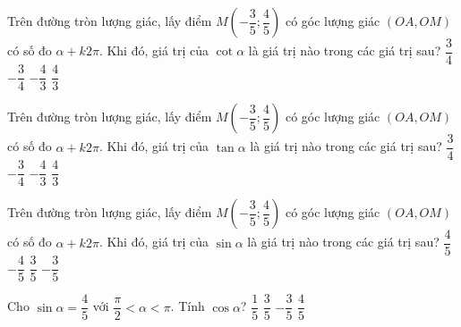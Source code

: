 \begin{ex}%
	Trên đường tròn lượng giác, lấy điểm $M\left(-\dfrac{3}{5};\dfrac{4}{5} \right)$ có góc lượng giác $(OA,OM)$ có số đo $\alpha+k2\pi$.  Khi đó, giá trị của $\cot \alpha$ là giá trị nào trong các giá trị sau?
	\choice 
		{$\dfrac{3}{4}$} 
		 {\True $-\dfrac{3}{4}$}
		{$-\dfrac{4}{3}$} 
		{$\dfrac{4}{3}$} 
\end{ex}

\begin{ex}%
	Trên đường tròn lượng giác, lấy điểm $M\left(-\dfrac{3}{5};\dfrac{4}{5} \right)$ có góc lượng giác $(OA,OM)$ có số  đo $\alpha+k2\pi$. Khi đó, giá trị của $\tan \alpha$ là giá trị nào trong các giá trị sau?
	\choice 
		 {$\dfrac{3}{4}$}
		{$-\dfrac{3}{4}$} 
		 {\True $-\dfrac{4}{3}$}
		{$\dfrac{4}{3}$} 
\end{ex}

\begin{ex}%
	Trên đường tròn lượng giác, lấy điểm $M\left(-\dfrac{3}{5};\dfrac{4}{5} \right)$ có góc lượng giác $(OA,OM)$ có số đo $\alpha+k2\pi$. Khi đó, giá trị của $\sin \alpha$ là giá trị nào trong các giá  trị sau?
	\choice 
		{\True  $\dfrac{4}{5}$}
		 {$-\dfrac{4}{5}$}
		 {$\dfrac{3}{5}$}
		 {$-\dfrac{3}{5}$}
\end{ex}

\begin{ex}%
	Cho $\sin\alpha =\dfrac{4}{5} $ với $\dfrac{\pi}{2} <\alpha <\pi  $. Tính $\cos\alpha $?
	\choice 
		 {$\dfrac{1}{5} $}
		{$\dfrac{3}{5} $} 
		{\True $-\dfrac{3}{5}  $}
		{$\dfrac{4}{5} $} 
\end{ex}

